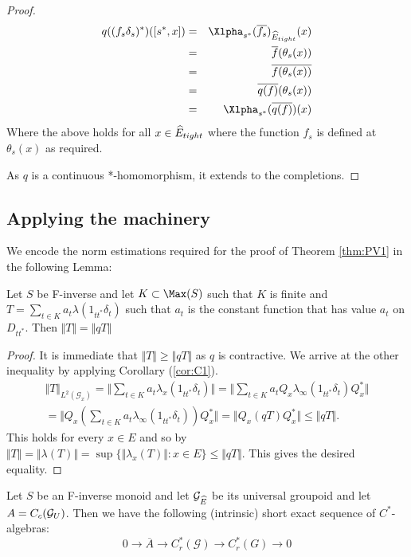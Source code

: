 \begin{corollary}
\begin{proof}
\begin{eqnarray*}
q((f_{s}\delta_{s})^{*})([s^{*},x])& = &\Xlpha_{s^{*}}(\overline{f_{s}})_{\E_{tight}}(x)\\
& = & \overline{f}(\theta_{s}(x)) \\ & = & \overline{f(\theta_{s}(x))} \\ & = & \overline{q(f)}(\theta_{s}(x)) \\ & = &  \Xlpha_{s^{*}}(\overline{q(f)})(x)
\end{eqnarray*}
Where the above holds for all $x \in \widehat{E}_{tight}$ where the function $f_{s}$ is defined at $\theta_{s}(x)$ as required.

As $q$ is a continuous *-homomorphism, it extends to the completions.
\end{proof}

\subsection{Applying the machinery}\label{sect:S1-a}
We encode the norm estimations required for the proof of Theorem \ref{thm:PV1} in the following Lemma:
\begin{lemma}\label{lem:L3}
Let $S$ be F-inverse and let $K \subset \Max(S)$ such that $K$ is finite and $T=\sum_{t \in K} a_{t}\lambda(1_{tt^{*}}\delta_{t})$ such that $a_{t}$ is the constant function that has value $a_{t}$ on $D_{tt^{*}}$. Then $\Vert T \Vert = \Vert qT \Vert$
\end{lemma}
\begin{proof}
It is immediate that $\Vert T \Vert \geq \Vert qT \Vert$ as $q$ is contractive. We arrive at the other inequality by applying Corollary (\ref{cor:C1}).
\begin{eqnarray*}
\Vert T \Vert_{L^{2}(\mathcal{G}_{x})} = \Vert \sum_{t \in K} a_{t}\lambda_{x}(1_{tt^{*}}\delta_{t}) \Vert = \Vert \sum_{t \in K} a_{t}Q_{x}\lambda_{\infty}(1_{tt^{*}}\delta_{t})Q_{x}^{*} \Vert \\
= \Vert Q_{x}(\sum_{t \in K} a_{t}\lambda_{\infty}(1_{tt^{*}}\delta_{t}))Q_{x}^{*} \Vert = \Vert Q_{x}(qT)Q_{x}^{*} \Vert \leq \Vert qT \Vert.
\end{eqnarray*}
This holds for every $x \in E$ and so by  $\Vert T \Vert = \Vert \lambda(T) \Vert = \sup \lbrace \Vert \lambda_{x}(T) \Vert : x \in E \rbrace \leq \Vert qT \Vert$. This gives the desired equality.  
\end{proof}

\begin{theorem}\label{thm:PV1}
Let $S$ be an F-inverse monoid and let $\mathcal{G}_{\widehat{E}}$ be its universal groupoid and let $A=C_{c}(\mathcal{G}_{U})$. Then we have the following (intrinsic) short exact sequence of $C^{*}$-algebras:
\begin{equation*}
0 \rightarrow \overline{A} \rightarrow C^{*}_{r}(\mathcal{G}) \rightarrow C^{*}_{r}(G) \rightarrow 0
\end{equation*}
\end{theorem}


\end{corollary}
